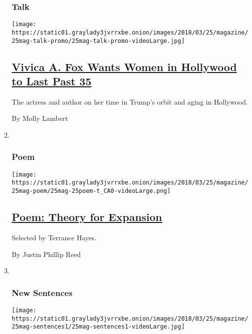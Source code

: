 \begin{enumerate}
{  \subsubsection{Talk}\label{talk}}

  \texttt{[image: https://static01.graylady3jvrrxbe.onion/images/2018/03/25/magazine/25mag-talk-promo/25mag-talk-promo-videoLarge.jpg]}

  \hypertarget{vivica-a-fox-wants-women-in-hollywood-to-last-past-35}{%
  \subsection{\texorpdfstring{\href{/2018/03/20/magazine/vivica-a-fox-wants-women-in-hollywood-to-last-past-35.html}{Vivica
  A. Fox Wants Women in Hollywood to Last Past
  35}}{Vivica A. Fox Wants Women in Hollywood to Last Past 35}}\label{vivica-a-fox-wants-women-in-hollywood-to-last-past-35}}

  The actress and author on her time in Trump's orbit and aging in
  Hollywood.

  By Molly Lambert
\item ~
  \hypertarget{poem}{%
  \subsubsection{Poem}\label{poem}}

  \texttt{[image: https://static01.graylady3jvrrxbe.onion/images/2018/03/25/magazine/25mag-poem/25mag-25poem-t\_CA0-videoLarge.png]}

  \hypertarget{poem-theory-for-expansion}{%
  \subsection{\texorpdfstring{\href{/2018/03/21/magazine/poem-theory-for-expansion.html}{Poem:
  Theory for
  Expansion}}{Poem: Theory for Expansion}}\label{poem-theory-for-expansion}}

  Selected by Terrance Hayes.

  By Justin Phillip Reed
\item ~
  \hypertarget{new-sentences}{%
  \subsubsection{New Sentences}\label{new-sentences}}

  \texttt{[image: https://static01.graylady3jvrrxbe.onion/images/2018/03/25/magazine/25mag-sentences1/25mag-sentences1-videoLarge.jpg]}


\end{enumerate}

